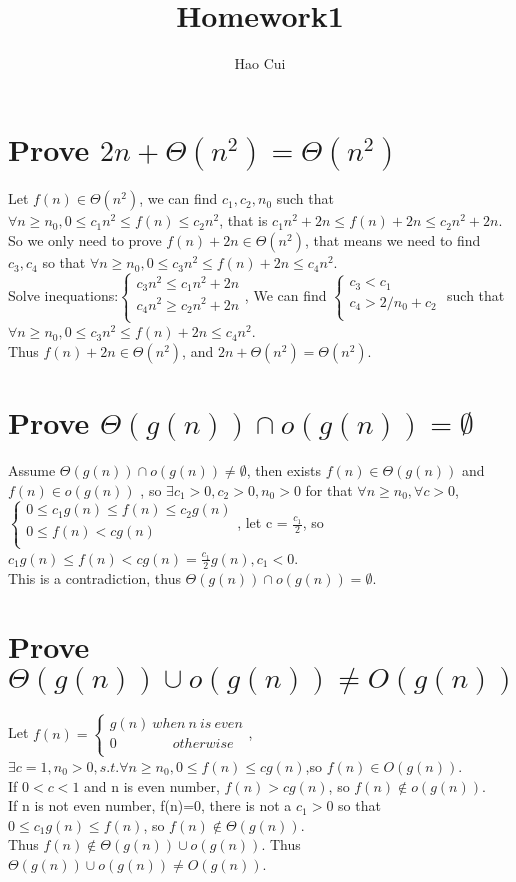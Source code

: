 \documentclass{article}
\title{Homework1}
\author{Hao Cui}
\begin{document}
\maketitle
\section{Prove $2n+\Theta(n^2)=\Theta(n^2)$}
Let $f(n)\in\Theta(n^2)$, we can find $c_1,c_2,n_0$ such that $\forall n\ge n_0, 0\le c_1n^2 \le f(n) \le c_2n^2$, that is
$c_1n^2 + 2n \le f(n)+2n \le c_2n^2+2n$.\\
So we only need to prove $f(n)+2n\in \Theta(n^2)$, that means we need to find $c_3,c_4$ so that $\forall n\ge n_0, 0\le c_3n^2 \le f(n)+ 2n \le c_4n^2$.\\
Solve inequations:$
\left\{
\begin{aligned}
c_3n^2 \le c_1n^2 + 2n \\
c_4n^2 \ge c_2n^2+2n \\
\end{aligned}\right.$, 
We can find $
\left\{
\begin{aligned}
c_3<c_1 \\
c_4>2/n_0 + c_2 \\
\end{aligned}\right. $ such that $\forall n\ge n_0, 0\le c_3n^2 \le f(n)+ 2n \le c_4n^2$.\\
Thus $f(n)+2n\in \Theta(n^2)$, and $2n+\Theta(n^2)=\Theta(n^2)$.
\section{Prove $\Theta(g(n))\cap o(g(n))=\emptyset$}
Assume $\Theta(g(n))\cap o(g(n))\neq\emptyset$, then exists $f(n) \in\Theta(g(n))$ and $f(n)\in o(g(n))$ ,
so $\exists c_1>0,c_2>0,n_0>0$ for that $\forall n \ge n_0,\forall c>0$,$
\left\{
\begin{aligned}
0\le c_1g(n) \le f(n) \le c_2g(n) \\
0\le f(n) < cg(n) \\
\end{aligned}\right.$, 
let c = $\frac{c_1}{2}$, so $c_1g(n)\le f(n)<cg(n)=\frac{c_1}{2}g(n), c_1 < 0$.\\
This is a contradiction, thus $\Theta(g(n))\cap o(g(n))=\emptyset$.
\section{Prove $\Theta(g(n))\cup o(g(n))\neq O(g(n))$}
Let $
f(n)=\left\{
\begin{aligned}
g(n) \ when\ n\ is\ even  \\
0  \qquad \qquad otherwise\\
\end{aligned}\right.$, 
$\exists c=1, n_0>0, s.t. \forall n\ge n_0,0\le f(n)\le cg(n)$,so $f(n)\in O(g(n))$.\\
If $0<c<1$ and n is even number, $f(n)>cg(n)$, so $f(n)\notin o(g(n))$.\\
If n is not even number, f(n)=0, there is not a $c_1>0$ so that $0\le c_1g(n) \le f(n)$, so $f(n)\notin \Theta(g(n))$.\\
Thus $f(n)\notin \Theta(g(n))\cup o(g(n))$.
Thus $\Theta(g(n))\cup o(g(n))\neq O(g(n))$.
\end{document}
